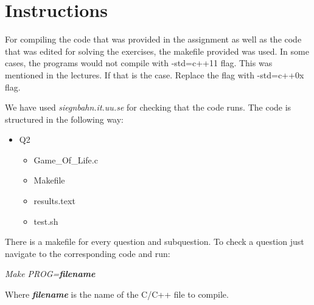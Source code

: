 \section{Instructions}

For compiling the code that was provided in the assignment as well as the 
code that was edited for solving the exercises, the makefile provided was used.
In some cases, the programs would not compile with -std=c++11 flag. This was mentioned
in the lectures. If that is the case. Replace the flag with -std=c++0x flag.

We have used \textit{siegnbahn.it.uu.se} for checking that the code runs.
The code is structured in the following way:

\begin{itemize}
    \item Q2
        \begin{itemize}
            \item Game\_Of\_Life.c
            \item Makefile
            \item results.text
            \item test.sh
        \end{itemize}
\end{itemize}

There is a makefile for every question and subquestion. To check a question
just navigate to the corresponding code and run:

\begin{center}
    \textit{Make PROG=\textbf{filename}}
\end{center}

Where \textit{\textbf{filename}} is the name of the C/C++ file to compile.